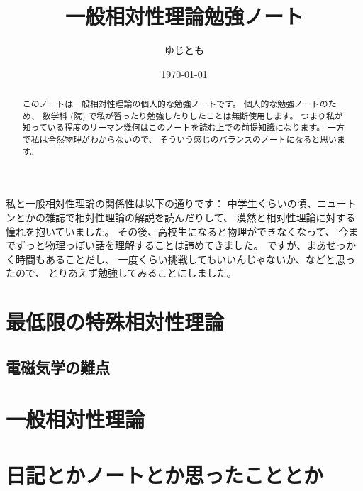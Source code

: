 \documentclass[uplatex]{jsarticle}
\theoremstyle{definition}
\begin{document}
\title{一般相対性理論勉強ノート}
\date{\today}
\author{ゆじとも}

\maketitle

\begin{abstract}
  このノートは一般相対性理論の個人的な勉強ノートです。
  個人的な勉強ノートのため、
  数学科 (院) で私が習ったり勉強したりしたことは無断使用します。
  つまり私が知っている程度のリーマン幾何はこのノートを読む上での前提知識になります。
  一方で私は全然物理がわからないので、
  そういう感じのバランスのノートになると思います。
\end{abstract}


\tableofcontents


私と一般相対性理論の関係性は以下の通りです：
中学生くらいの頃、ニュートンとかの雑誌で相対性理論の解説を読んだりして、
漠然と相対性理論に対する憧れを抱いていました。
その後、高校生になると物理ができなくなって、
今までずっと物理っぽい話を理解することは諦めてきました。
ですが、まあせっかく時間もあることだし、
一度くらい挑戦してもいいんじゃないか、などと思ったので、
とりあえず勉強してみることにしました。



\newpage
\section{最低限の特殊相対性理論}

\subsection{電磁気学の難点}





\section{一般相対性理論}








\newpage

\appendix

\section{日記とかノートとか思ったこととか}
\end{document}
